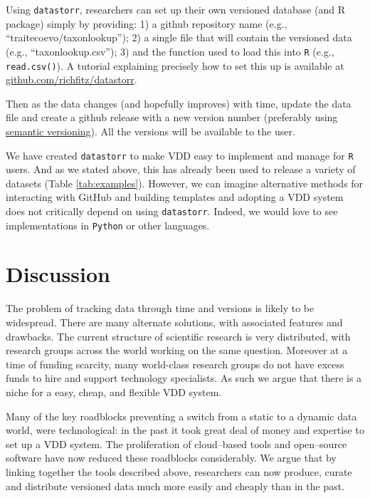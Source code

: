 \documentclass[a4paper,11pt]{article}
\newcommand{\smurl}[1]{{\footnotesize\url{#1}}}
\begin{document}
Using \texttt{datastorr}, researchers can set up their own versioned database (and R package) simply by providing: 1) a github repository name (e.g., ``traitecoevo/taxonlookup''); 2) a single file that will contain the versioned data (e.g., ``taxonlookup.csv''); 3) and the function used to load this into \texttt{R} (e.g., \texttt{read.csv()}). A tutorial explaining precisely how to set this up is available at \smurl{github.com/richfitz/datastorr}. %

Then as the data changes (and hopefully improves) with time, update the data
file and create a github release with a new version number (preferably
using \href{http://semver.org/}{semantic versioning}). All the versions
will be available to the user. 

We have created \texttt{datastorr} to make VDD easy to implement and manage for \texttt{R} users. And as we stated above, this has already been used to release a variety of datasets (Table \ref{tab:examples}). However, we can imagine alternative methods for interacting with GitHub and building templates and adopting a VDD system does not critically depend on using \texttt{datastorr}. Indeed, we would love to see implementations in \texttt{Python} or other languages.

\section{Discussion}

The problem of tracking data through time and versions is likely to be widespread. There are many alternate solutions, with associated features and drawbacks.  The current structure of scientific research is very distributed, with research groups across the world working on the same question.  Moreover at a time of funding scarcity, many world-class research groups do not have excess funds to hire and support technology specialists.  As such we argue that there is a niche for a easy, cheap, and flexible VDD system.  

Many of the key roadblocks preventing a switch from a static to a dynamic data world, were technological: in the past it took great deal of money and expertise to set up a VDD system. The proliferation of cloud--based tools and open--source software have now reduced these roadblocks considerably.  We argue that by linking together the tools described above, researchers can now produce, curate and distribute versioned data much more easily and cheaply than in the past.  
\end{document}
